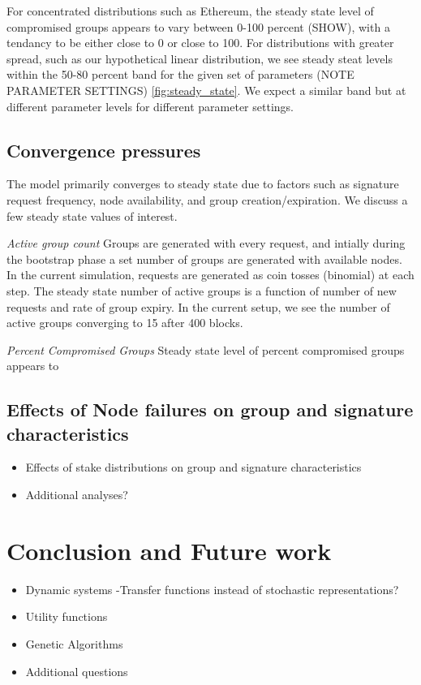 \documentclass[conference]{IEEEtran}
\begin{document}
For concentrated distributions such as Ethereum, the steady state level of compromised
groups appears to vary between 0-100 percent (SHOW), with a tendancy to be either close
to 0 or close to 100. For distributions with greater spread, such as our hypothetical linear
distribution, we see steady steat levels within the 50-80 percent band for the given set
of parameters (NOTE PARAMETER SETTINGS) \ref{fig:steady_state}. We expect a similar band but at
different parameter levels for different parameter settings.

\subsection{Convergence pressures}

The model primarily converges to steady state due to factors such as
signature request frequency, node availability, and group creation/expiration. We discuss a few
steady state values of interest.

\textit{Active group count} Groups are generated with every request, and intially
during the bootstrap phase a set number of groups are generated with available nodes. In the current
simulation, requests are generated as coin tosses (binomial) at each step. The steady state number of 
active groups is a function of number of new requests and rate of group expiry. In the current setup, 
we see the number of active groups converging to 15 after 400 blocks.

\textit{Percent Compromised Groups} Steady state level of percent compromised
groups appears to 


\subsection{Effects of Node failures on group and signature characteristics}

\begin{itemize}
    \item Effects of stake distributions on group and signature characteristics
    \item Additional analyses?
\end{itemize}

\section{Conclusion and Future work}
\begin{itemize}
\item Dynamic systems -Transfer functions instead of stochastic representations?
\item Utility functions
\item Genetic Algorithms
\item Additional questions
\end{itemize}
\end{document}
